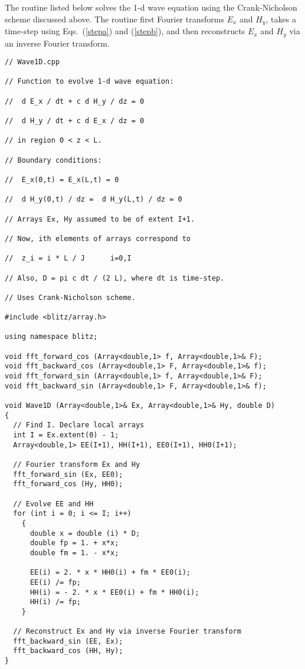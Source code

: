 The routine listed below solves the 1-d wave equation using the Crank-Nicholson scheme
discussed above. The routine first Fourier transforms $E_x$ and $H_y$, takes
a time-step using Eqs.~(\ref{stepa}) and (\ref{stepb}), and then reconstructs
$E_x$ and $H_y$ via an inverse Fourier transform.
{\small\begin{verbatim}
// Wave1D.cpp

// Function to evolve 1-d wave equation:

//  d E_x / dt + c d H_y / dz = 0

//  d H_y / dt + c d E_x / dz = 0

// in region 0 < z < L. 

// Boundary conditions: 

//  E_x(0,t) = E_x(L,t) = 0

//  d H_y(0,t) / dz =  d H_y(L,t) / dz = 0

// Arrays Ex, Hy assumed to be of extent I+1.

// Now, ith elements of arrays correspond to

//  z_i = i * L / J      i=0,I

// Also, D = pi c dt / (2 L), where dt is time-step.

// Uses Crank-Nicholson scheme.

#include <blitz/array.h>

using namespace blitz;

void fft_forward_cos (Array<double,1> f, Array<double,1>& F);
void fft_backward_cos (Array<double,1> F, Array<double,1>& f);
void fft_forward_sin (Array<double,1> f, Array<double,1>& F);
void fft_backward_sin (Array<double,1> F, Array<double,1>& f);

void Wave1D (Array<double,1>& Ex, Array<double,1>& Hy, double D)
{
  // Find I. Declare local arrays
  int I = Ex.extent(0) - 1;
  Array<double,1> EE(I+1), HH(I+1), EE0(I+1), HH0(I+1);

  // Fourier transform Ex and Hy
  fft_forward_sin (Ex, EE0);
  fft_forward_cos (Hy, HH0);

  // Evolve EE and HH
  for (int i = 0; i <= I; i++)
    {
      double x = double (i) * D;
      double fp = 1. + x*x;
      double fm = 1. - x*x;

      EE(i) = 2. * x * HH0(i) + fm * EE0(i);
      EE(i) /= fp;
      HH(i) = - 2. * x * EE0(i) + fm * HH0(i);
      HH(i) /= fp;
    }

  // Reconstruct Ex and Hy via inverse Fourier transform
  fft_backward_sin (EE, Ex);
  fft_backward_cos (HH, Hy);
}
\end{verbatim}}

